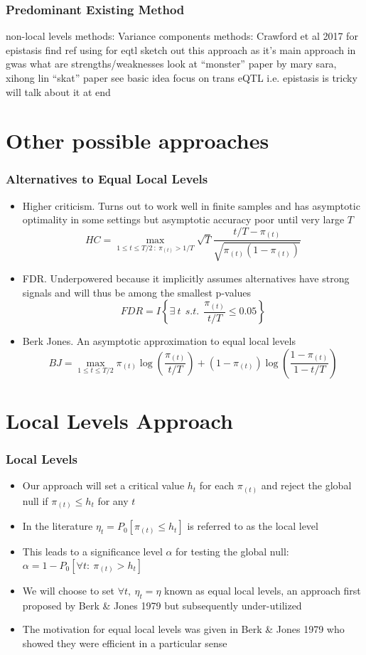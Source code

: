 \documentclass{beamer}
\begin{document}
\begin{frame}
\frametitle{Predominant Existing Method}
non-local levels methods:
Variance components methods: Crawford et al 2017 for epistasis find ref using for eqtl 
sketch out this approach as it’s main approach in gwas
what are strengths/weaknesses
look at “monster” paper by mary sara, xihong lin “skat” paper see basic idea
focus on trans eQTL i.e. epistasis is tricky will talk about it at end
\end{frame}

\section{Other possible approaches}

\begin{frame}
\frametitle{Alternatives to Equal Local Levels}
\begin{itemize}
\item Higher criticism.  Turns out to work well in finite samples and has asymptotic optimality in some settings but asymptotic accuracy poor until very large $T$
$$HC=\max_{1\le t\le T/2\ :\ \pi_{(t)}>1/T}\sqrt{T}\frac{t/T-\pi_{(t)}}{\sqrt{\pi_{(t)}(1-\pi_{(t)})}}$$
\item FDR. Underpowered because it implicitly assumes alternatives have strong signals and will thus be among the smallest p-values
$$FDR=I\left\{\exists\ t\ \ s.t.\ \ \frac{\pi_{(t)}}{t/T}\le 0.05\right\}$$
\item Berk Jones. An asymptotic approximation to equal local levels
$$BJ=\max_{1\le t\le T/2}\pi_{(t)}\log\left(\frac{\pi_{(t)}}{t/T}\right)+(1-\pi_{(t)})\log\left(\frac{1-\pi_{(t)}}{1-t/T}\right)$$
\end{itemize}
\end{frame}

\section{Local Levels Approach}

\begin{frame}
\frametitle{Local Levels}
\begin{itemize}
\item Our approach will set a critical value $h_t$ for each $\pi_{(t)}$ and reject the global null if $\pi_{(t)}\le h_t$ for any $t$
\item In the literature $\eta_t=P_0\left[\pi_{(t)}\le h_t\right]$ is referred to as the local level
\item This leads to a significance level $\alpha$ for testing the global null: $\alpha=1-P_0\left[\forall t:\ \pi_{(t)}>h_t\right]$
\item We will choose to set $\forall t,\ \eta_t=\eta$ known as equal local levels, an approach first proposed by Berk \& Jones 1979 but subsequently under-utilized
\item The motivation for equal local levels was given in Berk \& Jones 1979 who showed they were efficient in a particular sense
\end{itemize}
\end{frame}
\end{document}
